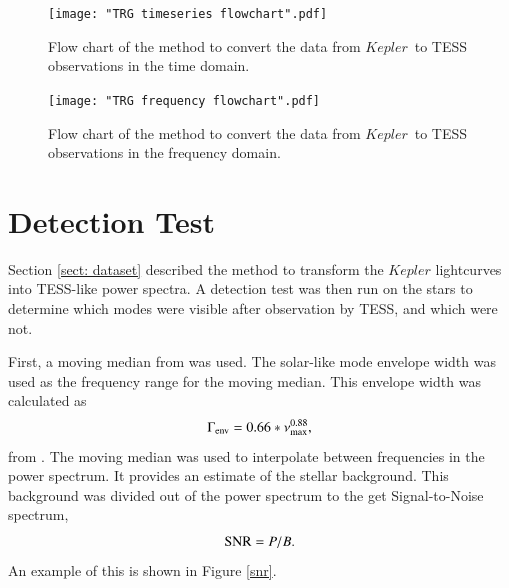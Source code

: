 \documentclass[a4paper,fleqn,usenatbib,useAMS]{mnras}
\newcommand{\numax}{\ensuremath{\nu_{\textrm{max}}}}
\newcommand{\kep}{\ensuremath{Kepler}}
\begin{document}
\onecolumn
\begin{figure}
	\centering
	\texttt{[image: "TRG timeseries flowchart".pdf]}
	\caption{Flow chart of the method to convert the data from \kep \ to TESS observations in the time domain.}	
	\label{ts flowchart}
\end{figure} 

\begin{figure}
	\centering
	\texttt{[image: "TRG frequency flowchart".pdf]}
	\caption{Flow chart of the method to convert the data from \kep \ to TESS observations in the frequency domain.}	
	\label{fr flowchart}
\end{figure}
\newpage
\twocolumn
\fi

\section{Detection Test}
\label{sect: det_test}

Section \ref{sect: dataset} described the method to transform the $Kepler$ lightcurves into TESS-like power spectra. A detection test was then run on the stars to determine which modes were visible after observation by TESS, and which were not.

First, a moving median from \citet{davies_asteroseismology_2016} was used. The solar-like mode envelope width was used as the frequency range for the moving median. This envelope width was calculated as
\begin{equation}
\Gamma_{\rm env} = 0.66 * \numax^{0.88},
\end{equation}
from \citet{mosser_characterization_2012}. The moving median was used to interpolate between frequencies in the power spectrum. It provides an estimate of the stellar background. This background was divided out of the power spectrum to the get Signal-to-Noise spectrum,
\begin{equation}
\label{eq:snr}
{\rm SNR} = P/B.
\end{equation}
An example of this is shown in Figure \ref{snr}.
\end{document}

